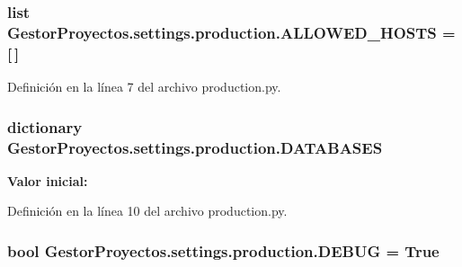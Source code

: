 \subsubsection[{\texorpdfstring{A\+L\+L\+O\+W\+E\+D\+\_\+\+H\+O\+S\+TS}{ALLOWED_HOSTS}}]{\setlength{\rightskip}{0pt plus 5cm}list Gestor\+Proyectos.\+settings.\+production.\+A\+L\+L\+O\+W\+E\+D\+\_\+\+H\+O\+S\+TS = \mbox{[}$\,$\mbox{]}}\hypertarget{namespace_gestor_proyectos_1_1settings_1_1production_ae13b1a28db97970095ee64b7e7ac8663}{}\label{namespace_gestor_proyectos_1_1settings_1_1production_ae13b1a28db97970095ee64b7e7ac8663}


Definición en la línea 7 del archivo production.\+py.

\subsubsection[{\texorpdfstring{D\+A\+T\+A\+B\+A\+S\+ES}{DATABASES}}]{\setlength{\rightskip}{0pt plus 5cm}dictionary Gestor\+Proyectos.\+settings.\+production.\+D\+A\+T\+A\+B\+A\+S\+ES}\hypertarget{namespace_gestor_proyectos_1_1settings_1_1production_a8cfcda1b42d37da48291029b4343e355}{}\label{namespace_gestor_proyectos_1_1settings_1_1production_a8cfcda1b42d37da48291029b4343e355}
{\bfseries Valor inicial\+:}


Definición en la línea 10 del archivo production.\+py.

\subsubsection[{\texorpdfstring{D\+E\+B\+UG}{DEBUG}}]{\setlength{\rightskip}{0pt plus 5cm}bool Gestor\+Proyectos.\+settings.\+production.\+D\+E\+B\+UG = True}\hypertarget{namespace_gestor_proyectos_1_1settings_1_1production_abd0ae018aa0ff29a3b22393c0cdbfb54}{}\label{namespace_gestor_proyectos_1_1settings_1_1production_abd0ae018aa0ff29a3b22393c0cdbfb54}


